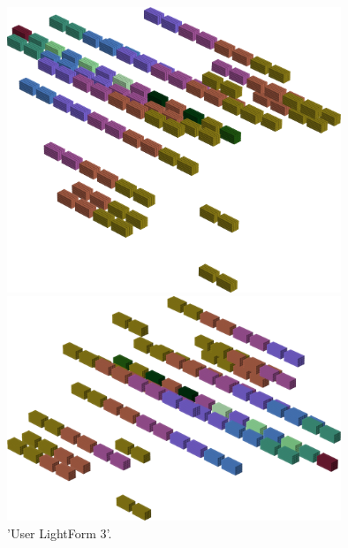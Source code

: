 \begin{figure}[H]
    \centering
    \begin{adjustbox}{width=10cm,center}
      \includegraphics[width=10cm]{src/colorspace_patterns/pattern11-45.png}%
    \end{adjustbox}
    \begin{adjustbox}{width=10cm}
      \includegraphics[width=10cm]{src/colorspace_patterns/pattern11-225.png}%
    \end{adjustbox}
\caption{'User LightForm 3'.}
\end{figure}
\clearpage

